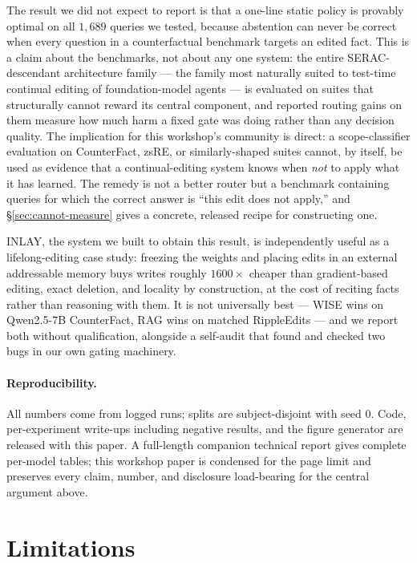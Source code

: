 \documentclass{article}
\begin{document}
The result we did not expect to report is that a one-line static policy is
provably optimal on all $1{,}689$ queries we tested, because abstention can
never be correct when every question in a counterfactual benchmark targets
an edited fact. This is a claim about the benchmarks, not about any one
system: the entire SERAC-descendant architecture family --- the family most
naturally suited to test-time continual editing of foundation-model agents
--- is evaluated on suites that structurally cannot reward its central
component, and reported routing gains on them measure how much harm a fixed
gate was doing rather than any decision quality. The implication for this
workshop's community is direct: a scope-classifier evaluation on
CounterFact, zsRE, or similarly-shaped suites cannot, by itself, be used as
evidence that a continual-editing system knows when \emph{not} to apply
what it has learned. The remedy is not a better router but a benchmark
containing queries for which the correct answer is ``this edit does not
apply,'' and \S\ref{sec:cannot-measure} gives a concrete, released recipe
for constructing one.

INLAY, the system we built to obtain this result, is independently useful
as a lifelong-editing case study: freezing the weights and placing edits in
an external addressable memory buys writes roughly $1600\times$ cheaper
than gradient-based editing, exact deletion, and locality by construction,
at the cost of reciting facts rather than reasoning with them. It is not
universally best --- WISE wins on Qwen2.5-7B CounterFact, RAG wins on
matched RippleEdits --- and we report both without qualification, alongside
a self-audit that found and checked two bugs in our own gating machinery.

\paragraph{Reproducibility.} All numbers come from logged runs; splits are
subject-disjoint with seed $0$. Code, per-experiment write-ups including
negative results, and the figure generator are released with this paper.
A full-length companion technical report gives complete per-model tables;
this workshop paper is condensed for the page limit and preserves every
claim, number, and disclosure load-bearing for the central argument above.

\section*{Limitations}
\end{document}
